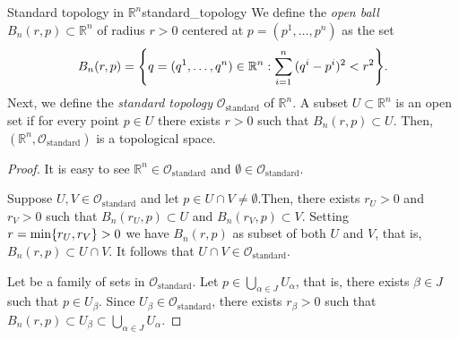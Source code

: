 \begin{proposition}{Standard topology in \(\mathbb{R}^n\)}{standard_topology}
    We define the \emph{open ball} \(B_n(r,p) \subset \mathbb{R}^n\) of radius \(r > 0\) centered at \(p = (p^1, \dots, p^n)\) as the set
    \begin{equation*}
        B_n(r, p) = \set*{q = (q^1, \dots, q^n) \in \mathbb{R}^n : \sum_{i=1}^{n}{(q^i - p^i)^2} < r^2}.
    \end{equation*}
    Next, we define the \emph{standard topology} \(\mathcal{O}_\text{standard}\) of \(\mathbb{R}^n\). A subset \(U \subset \mathbb{R}^n\) is an open set if for every point \(p \in U\) there exists \(r > 0\) such that \(B_n(r, p) \subset U\). Then, \((\mathbb{R}^n, \mathcal{O}_\text{standard})\) is a topological space.
\end{proposition}
\begin{proof}
    It is easy to see \(\mathbb{R}^n\in\mathcal{O}_{\text{standard}}\) and \(\emptyset \in \mathcal{O}_{\text{standard}}\).

    Suppose \(U, V \in \mathcal{O}_{\text{standard}}\) and let \(p \in U \cap V \neq \emptyset\).Then, there exists \(r_U > 0\) and \(r_V > 0\) such that \(B_n(r_U, p) \subset U\) and \(B_n(r_V, p) \subset V\). Setting \(r = \min\{r_U, r_V\} > 0\) we have \(B_n(r, p)\) as subset of both \(U\) and \(V\), that is, \(B_n(r, p) \subset U\cap V\). It follows that \(U\cap V\in\mathcal{O}_\text{standard}\).

    Let  be a family of sets in \(\mathcal{O}_\text{standard}\). Let \(p \in \bigcup_{\alpha\in J}U_\alpha\), that is, there exists \(\beta \in J\) such that \(p \in U_\beta\). Since \(U_\beta \in \mathcal{O}_\text{standard}\), there exists \(r_\beta > 0\) such that \(B_n(r, p) \subset U_\beta \subset \bigcup_{\alpha \in J} U_\alpha\).
\end{proof}

